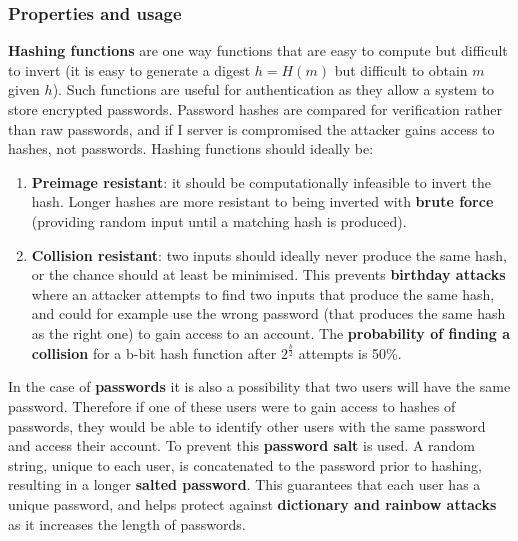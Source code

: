 \documentclass{article}
\begin{document}
\subsubsection{Properties and usage}
\textbf{Hashing functions} are one way functions that are easy to compute but difficult to invert (it is easy to generate a digest $ h = H(m) $ but difficult to obtain $ m $ given $ h $). Such functions are useful for authentication as they allow a system to store encrypted passwords. Password hashes are compared for verification rather than raw passwords, and if I server is compromised the attacker gains access to hashes, not passwords. Hashing functions should ideally be:
\begin{enumerate}
	\item \textbf{Preimage resistant}: it should be computationally infeasible to invert the hash. Longer hashes are more resistant to being inverted with \textbf{brute force} (providing random input until a matching hash is produced).
	\item \textbf{Collision resistant}: two inputs should ideally never produce the same hash, or the chance should at least be minimised. This prevents \textbf{birthday attacks} where an attacker attempts to find two inputs that produce the same hash, and could for example use the wrong password (that produces the same hash as the right one) to gain access to an account. The \textbf{probability of finding a collision} for a b-bit hash function after $ 2^{\frac{b}{2}} $ attempts is 50\%.
\end{enumerate}
In the case of \textbf{passwords} it is also a possibility that two users will have the same password. Therefore if one of these users were to gain access to hashes of passwords, they would be able to identify other users with the same password and access their account. To prevent this \textbf{password salt} is used. A random string, unique to each user, is concatenated to the password prior to hashing, resulting in a longer \textbf{salted password}. This guarantees that each user has a unique password, and helps protect against \textbf{dictionary and rainbow attacks} as it increases the length of passwords.
\end{document}
